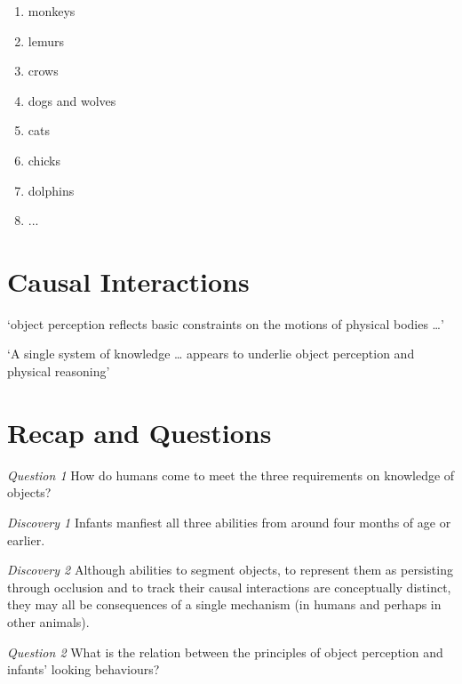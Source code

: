 \documentclass[12pt]{extarticle}
\begin{document}
\begin{multicols}{3}
\begin{enumerate}
\item monkeys \citep{santos:2006_cotton-top}
 
\item lemurs \citep{deppe:2009_object}
 
\item crows \citep{hoffmann:2011_ontogeny}
 
\item dogs and wolves \citep{fiset:2013_object}
 
\item cats \citep{triana:1981_object}
 
\item chicks \citep{chiandetti:2011_chicks_op}
 
\item dolphins \citep{jaakkola:2010_what}
 
\item ...
 
\end{enumerate}
 
 
 
\section{Causal Interactions}
 
‘object perception reflects basic constraints on the motions of physical bodies …’
\citep[p.\ 51]{Spelke:1990jn}
 
‘A single system of knowledge … appears to underlie object perception and physical reasoning’
\citep[p.\ 175]{Carey:1994bh}
 
 
 
\section{Recap and Questions}
 
\emph{Question 1}  How do humans come to meet the three requirements on knowledge of objects?
 
\emph{Discovery 1} Infants manfiest all three abilities from around four months of age or earlier.
 
\emph{Discovery 2} Although abilities to segment objects, to represent them as persisting through occlusion and  to track their causal interactions are conceptually distinct, they may all be consequences of a single mechanism (in humans and perhaps in other animals).
 
\emph{Question 2} What is the relation between the principles of object perception and infants’ looking behaviours?
 

\end{multicols}
\end{document}
